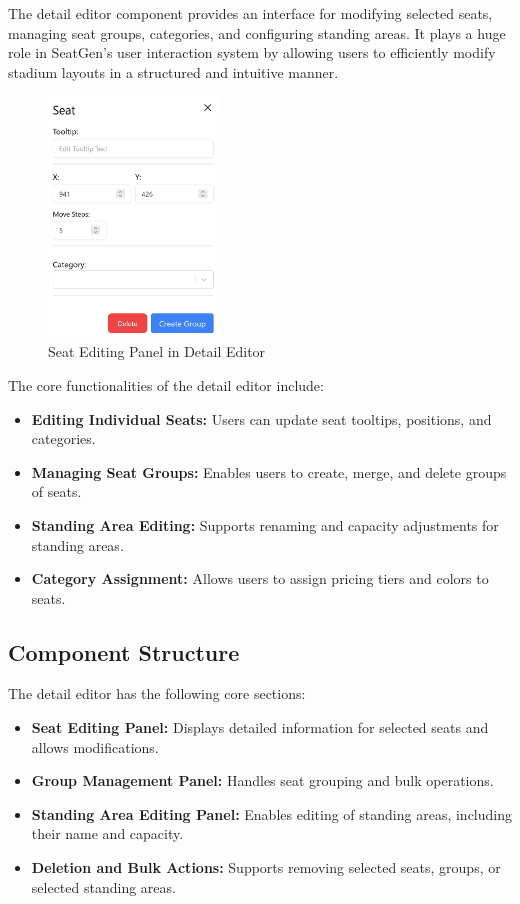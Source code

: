The detail editor component provides an interface for modifying selected seats, managing seat groups, categories, and configuring standing areas. It plays a huge role in SeatGen’s user interaction system by allowing users to efficiently modify stadium layouts in a structured and intuitive manner.

\begin{figure}
    \begin{center}
    \includegraphics[width=0.4\textwidth]{pics/DetailEditorSeat.png}
    \caption{Seat Editing Panel in Detail Editor}
    \label{fig:detail-editor-seat}
    \end{center}
\end{figure}

The core functionalities of the detail editor include:
\begin{itemize}
    \item \textbf{Editing Individual Seats:} Users can update seat tooltips, positions, and categories.
    \item \textbf{Managing Seat Groups:} Enables users to create, merge, and delete groups of seats.
    \item \textbf{Standing Area Editing:} Supports renaming and capacity adjustments for standing areas.
    \item \textbf{Category Assignment:} Allows users to assign pricing tiers and colors to seats.
\end{itemize}

\subsection{Component Structure}
The detail editor has the following core sections:

\begin{itemize}
    \item \textbf{Seat Editing Panel:} Displays detailed information for selected seats and allows modifications.
    \item \textbf{Group Management Panel:} Handles seat grouping and bulk operations.
    \item \textbf{Standing Area Editing Panel:} Enables editing of standing areas, including their name and capacity.
    \item \textbf{Deletion and Bulk Actions:} Supports removing selected seats, groups, or selected standing areas.
\end{itemize}

